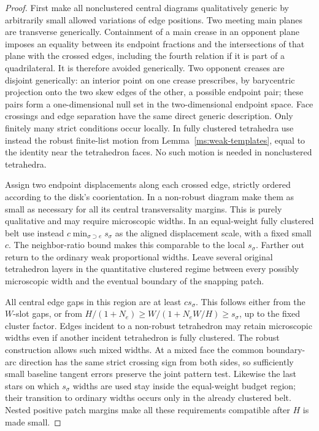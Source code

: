 \documentclass[11pt]{article}
\numberwithin{equation}{section}
\theoremstyle{definition}
\theoremstyle{remark}
\begin{document}
\begin{proof}
First make all nonclustered central diagrams qualitatively generic
by arbitrarily small allowed variations of edge positions.  Two
meeting main planes are transverse generically.  Containment of a
main crease in an opponent plane imposes an equality between its
endpoint fractions and the intersections of that plane with the
crossed edges, including the fourth relation if it is part of a
quadrilateral.  It is therefore avoided generically.  Two opponent
creases are disjoint generically: an interior point on one crease
prescribes, by barycentric projection onto the two skew edges of
the other, a possible endpoint pair; these pairs form a
one-dimensional null set in the two-dimensional endpoint space.
Face crossings and edge separation have the same direct generic
description.  Only finitely many strict conditions occur locally.
In fully clustered tetrahedra use instead the robust finite-list
motion from Lemma~\ref{ms:weak-templates}, equal to the identity near the
tetrahedron faces.  No such motion is needed in nonclustered
tetrahedra.

Assign two endpoint displacements along each crossed edge,
strictly ordered according to the disk's coorientation.  In a
non-robust diagram make them as small as necessary for all its
central transversality margins.  This is purely qualitative and
may require microscopic widths.  In an equal-weight fully
clustered belt use instead $c\min_{\sigma\supset e}s_\sigma$ as
the aligned displacement scale, with a fixed small $c$.  The
neighbor-ratio bound makes this comparable to the local
$s_\sigma$.  Farther out return to the ordinary weak proportional
widths.  Leave several original tetrahedron layers in the
quantitative clustered regime between every possibly microscopic
width and the eventual boundary of the snapping patch.

All central edge gaps in this region are at least $c s_\sigma$.
This follows either from the $W$-slot gaps, or from
$H/(1+N_e)\ge W/(1+N_eW/H)\ge s_\sigma$, up to the fixed cluster
factor.  Edges incident to a non-robust tetrahedron may retain
microscopic widths even if another incident tetrahedron is fully
clustered.  The robust construction allows such mixed widths.
At a mixed face the common boundary-arc direction has the same
strict crossing sign from both sides, so sufficiently small
baseline tangent errors preserve the joint pattern test.
Likewise the last stars on which $s_\sigma$ widths are used stay
inside the equal-weight budget region; their transition to
ordinary widths occurs only in the already clustered belt.
Nested positive patch margins make all these requirements
compatible after $H$ is made small.


\end{proof}
\end{document}
